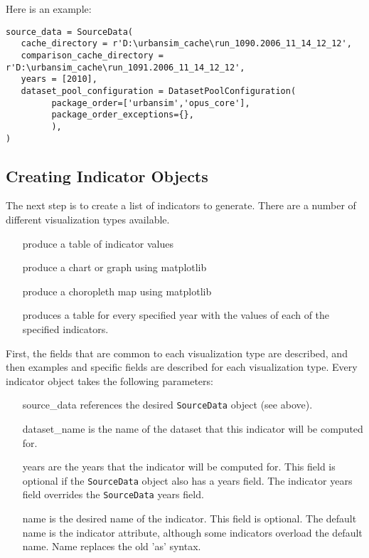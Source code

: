 Here is an example:

\begin{verbatim}
source_data = SourceData(
   cache_directory = r'D:\urbansim_cache\run_1090.2006_11_14_12_12',
   comparison_cache_directory = r'D:\urbansim_cache\run_1091.2006_11_14_12_12',
   years = [2010],
   dataset_pool_configuration = DatasetPoolConfiguration(
         package_order=['urbansim','opus_core'],
         package_order_exceptions={},
         ),                  
)
\end{verbatim}

\subsection{Creating Indicator Objects}

The next step is to create a list of indicators to generate. There are a 
number of different visualization types available. 

\begin{itemize}
\tight
\item[\code{table}]  produce a table  of indicator \indicatorsindex values
\item[\code{chart}]  produce a chart  or graph  using matplotlib \matplotlibindex
\item[\code{map}]  produce a choropleth map  using matplotlib \matplotlibindex
\item[\code{dataset_table}] produces a table for every specified year 
with the values of each of the specified indicators.
\end{itemize}

First, the fields 
that are common to each visualization type are described, and then examples and
specific fields are described for each visualization type. Every indicator 
object takes the following parameters:

\begin{itemize}
\tight
\item[source_data] references the desired \verb|SourceData| object (see above). 

\item[dataset_name] is the name of the dataset that this indicator will be 
computed for.

\item[years] are the years that the indicator will be computed for.
This field is optional if the \verb|SourceData| object also 
has a years field. The indicator years field overrides
the \verb|SourceData| years field.

\item[name] is the desired name of the indicator. This field is optional. 
The default name is the indicator attribute, although 
some indicators overload the default name. Name replaces 
the old 'as' syntax.

\end{itemize}

